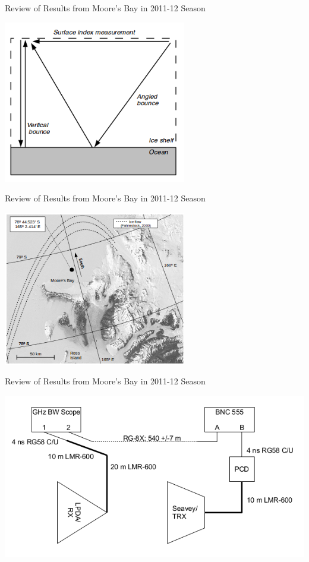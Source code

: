 \documentclass{beamer}
\begin{document}
\begin{frame}{Review of Results from Moore's Bay in 2011-12 Season}
\begin{center}
\includegraphics[width=0.6\textwidth]{mooreSetup3.png}
\end{center}
\end{frame}

\begin{frame}{Review of Results from Moore's Bay in 2011-12 Season}
\begin{center}
\includegraphics[width=0.6\textwidth]{moore.png}
\end{center}
\end{frame}

\begin{frame}{Review of Results from Moore's Bay in 2011-12 Season}
\begin{center}
\includegraphics[width=\textwidth]{mooreSetup.png}
\end{center}
\end{frame}
\end{document}
